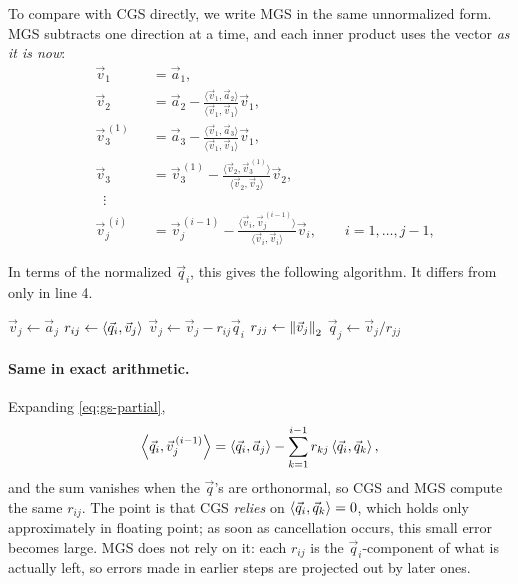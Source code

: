 To compare with CGS directly, we write MGS in the same unnormalized form. MGS subtracts one direction at a time, and each inner product uses the vector \emph{as it is now}:
\begin{equation}
  \label{eq:mgs}
  \begin{alignedat}{2}
    &\vec{v}_1 &&= \vec{a}_1, \\
    &\vec{v}_2 &&= \vec{a}_2 - \frac{\langle\vec{v}_{1}, \vec{a}_{2}\rangle}{\langle\vec{v}_{1}, \vec{v}_{1}\rangle}\vec{v}_1, \\
    &\vec{v}_3^{\,(1)} &&= \vec{a}_3 - \frac{\langle\vec{v}_{1}, \vec{a}_{3}\rangle}{\langle\vec{v}_{1}, \vec{v}_{1}\rangle}\vec{v}_1, \\
    &\vec{v}_3 &&= \vec{v}_3^{\,(1)} - \frac{\langle\vec{v}_{2}, \vec{v}_3^{\,(1)}\rangle}{\langle\vec{v}_{2}, \vec{v}_{2}\rangle}\vec{v}_2, \\
    &\;\;\vdots \\
    &\vec{v}_j^{\,(i)} &&= \vec{v}_j^{\,(i-1)} - \frac{\langle\vec{v}_i, \vec{v}_j^{\,(i-1)}\rangle}{\langle\vec{v}_i, \vec{v}_i\rangle}\vec{v}_i, \qquad i = 1, \dots, j - 1,
  \end{alignedat}
\end{equation}

In terms of the normalized $\vec{q}_i$, this gives the following algorithm. It differs from  only in line 4.

\begin{algorithm}[H]
  \caption{Modified Gram--Schmidt (MGS).}
  \label{alg:mgs}
  \begin{algorithmic}[1]
      \State $\vec{v}_j \gets \vec{a}_j$
        \State $r_{ij} \gets \left\langle \vec{q}_i, \vec{v}_j \right\rangle$ 
        \State $\vec{v}_j \gets \vec{v}_j - r_{ij}\vec{q}_i$
      \EndFor
      \State $r_{jj} \gets \left\lVert \vec{v}_j \right\rVert_2$
      \State $\vec{q}_j \gets \vec{v}_j / r_{jj}$
    \EndFor
  \end{algorithmic}
\end{algorithm}

\paragraph{Same in exact arithmetic.} Expanding \eqref{eq:gs-partial},
\begin{equation}
  \left\langle \vec{q}_i, \vec{v}_j^{\,(i-1)} \right\rangle = \left\langle \vec{q}_i, \vec{a}_j \right\rangle - \sum_{k=1}^{i-1} r_{kj}\left\langle \vec{q}_i, \vec{q}_k \right\rangle,
\end{equation}
and the sum vanishes when the $\vec{q}$'s are orthonormal, so CGS and MGS compute the same $r_{ij}$. The point is that CGS \emph{relies} on $\left\langle \vec{q}_i, \vec{q}_k \right\rangle = 0$, which holds only approximately in floating point; as soon as cancellation occurs, this small error becomes large. MGS does not rely on it: each $r_{ij}$ is the $\vec{q}_i$-component of what is actually left, so errors made in earlier steps are projected out by later ones.


